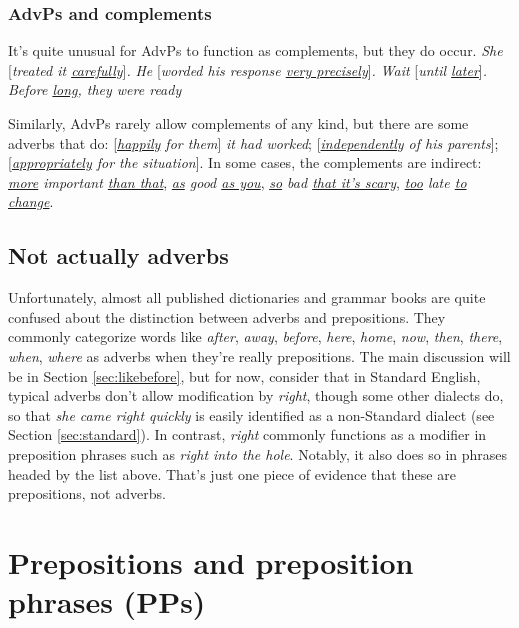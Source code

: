 \subsubsection*{AdvPs and complements} \label{sec:AdvPs+Comps}
It's quite unusual for AdvPs to function as complements, but they do occur. \textit{She }[\textit{treated it \uline{carefully}}]\textit{.} \textit{He }[\textit{worded his response \uline{very precisely}}]\textit{.} \textit{Wait }[\textit{until \uline{later}}]\textit{.} \textit{{\ob}Before \uline{long}{\cb}, they were ready}

Similarly, AdvPs rarely allow complements of any kind, but there are some adverbs that do: [\textit{\uline{happily} for them}]\textit{ it had worked}; [\textit{\uline{independently} of his parents}]; [\textit{\uline{appropriately} for the situation}]. In some cases, the complements are indirect: \textit{\uline{more} important \uline{than that}}, \textit{\uline{as} good \uline{as you}}, \textit{\uline{so} bad \uline{that it's scary}}, \textit{\uline{too} late \uline{to change}}.


\subsection{Not actually adverbs}
Unfortunately, almost all published dictionaries and grammar books are quite confused about the distinction between adverbs and prepositions. They commonly categorize words like \textit{after}, \textit{away}, \textit{before}, \textit{here}, \textit{home}, \textit{now}, \textit{then}, \textit{there}, \textit{when}, \textit{where} as adverbs when they're really prepositions. The main discussion will be in Section \ref{sec:likebefore}, but for now, consider that in Standard English, typical adverbs don't allow modification by \textit{right}, though some other dialects do, so that \textit{she came right quickly} is easily identified as a non-Standard dialect (see Section \ref{sec:standard}). In contrast, \textit{right} commonly functions as a modifier in preposition phrases such as \textit{right into the hole}. Notably, it also does so in phrases headed by the list above. That's just one piece of evidence that these are prepositions, not adverbs.


\section{Prepositions and preposition phrases (PPs)} \label{sec:prepositions}

